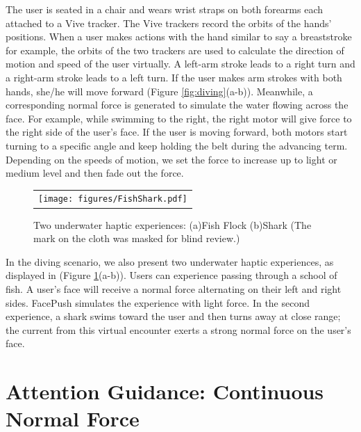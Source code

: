 The user is seated in a chair and wears wrist straps on both forearms each attached to a Vive tracker. The Vive trackers record the orbits of the hands' positions. When a user makes actions with the hand similar to say a breaststroke for example, the orbits of the two trackers are used to calculate the direction of motion and speed of the user virtually. A left-arm stroke leads to a right turn and a right-arm stroke leads to a left turn. If the user makes arm strokes with both hands, she/he will move forward (Figure \ref{fig:diving}(a-b)). Meanwhile, a corresponding normal force is generated to simulate the water flowing across the face. For example, while swimming to the right, the right motor will give force to the right side of the user's face. If the user is moving forward, both motors start turning to a specific angle and keep holding the belt during the advancing term. Depending on the speeds of motion, we set the force to increase up to light or medium level and then fade out the force.

\begin{figure}[h]
    \begin{center}
        \begin{tabular}{@{\hspace{0.1cm}}c}
            \texttt{[image: figures/FishShark.pdf]}
        \end{tabular}
        \caption{Two underwater haptic experiences: (a)Fish Flock (b)Shark (The mark on the cloth was masked for blind review.)}
        \label{fig:fishshark}
    \end{center}
\end{figure}

In the diving scenario, we also present two underwater haptic experiences, as displayed in (Figure \ref{fig:fishshark}(a-b)). Users can experience passing through a school of fish. A user's face will receive a normal force alternating on their left and right sides. FacePush simulates the experience with light force. In the second experience, a shark swims toward the user and then turns away at close range; the current from this virtual encounter exerts a strong normal force on the user's face.



\section{Attention Guidance: Continuous Normal Force }

